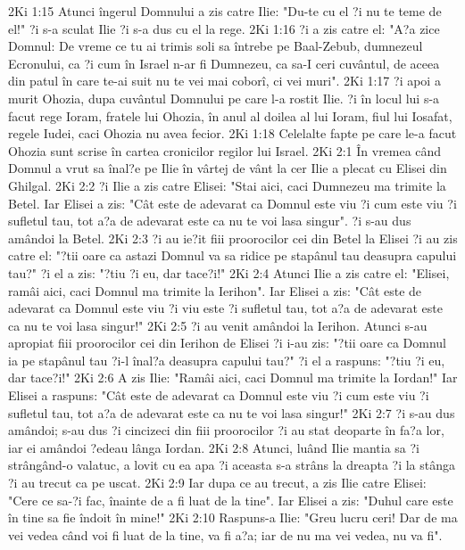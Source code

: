 2Ki 1:15  Atunci îngerul Domnului a zis catre Ilie: "Du-te cu el ?i nu te teme de el!" ?i s-a sculat Ilie ?i s-a dus cu el la rege.
2Ki 1:16  ?i a zis catre el: "A?a zice Domnul: De vreme ce tu ai trimis soli sa întrebe pe Baal-Zebub, dumnezeul Ecronului, ca ?i cum în Israel n-ar fi Dumnezeu, ca sa-I ceri cuvântul, de aceea din patul în care te-ai suit nu te vei mai coborî, ci vei muri".
2Ki 1:17  ?i apoi a murit Ohozia, dupa cuvântul Domnului pe care l-a rostit Ilie. ?i în locul lui s-a facut rege Ioram, fratele lui Ohozia, în anul al doilea al lui Ioram, fiul lui Iosafat, regele Iudei, caci Ohozia nu avea fecior.
2Ki 1:18  Celelalte fapte pe care le-a facut Ohozia sunt scrise în cartea cronicilor regilor lui Israel.
2Ki 2:1  În vremea când Domnul a vrut sa înal?e pe Ilie în vârtej de vânt la cer Ilie a plecat cu Elisei din Ghilgal.
2Ki 2:2  ?i Ilie a zis catre Elisei: "Stai aici, caci Dumnezeu ma trimite la Betel. Iar Elisei a zis: "Cât este de adevarat ca Domnul este viu ?i cum este viu ?i sufletul tau, tot a?a de adevarat este ca nu te voi lasa singur". ?i s-au dus amândoi la Betel.
2Ki 2:3  ?i au ie?it fiii proorocilor cei din Betel la Elisei ?i au zis catre el: "?tii oare ca astazi Domnul va sa ridice pe stapânul tau deasupra capului tau?" ?i el a zis: "?tiu ?i eu, dar tace?i!"
2Ki 2:4  Atunci Ilie a zis catre el: "Elisei, ramâi aici, caci Domnul ma trimite la Ierihon". Iar Elisei a zis: "Cât este de adevarat ca Domnul este viu ?i viu este ?i sufletul tau, tot a?a de adevarat este ca nu te voi lasa singur!"
2Ki 2:5  ?i au venit amândoi la Ierihon. Atunci s-au apropiat fiii proorocilor cei din Ierihon de Elisei ?i i-au zis: "?tii oare ca Domnul ia pe stapânul tau ?i-l înal?a deasupra capului tau?" ?i el a raspuns: "?tiu ?i eu, dar tace?i!"
2Ki 2:6  A zis Ilie: "Ramâi aici, caci Domnul ma trimite la Iordan!" Iar Elisei a raspuns: "Cât este de adevarat ca Domnul este viu ?i cum este viu ?i sufletul tau, tot a?a de adevarat este ca nu te voi lasa singur!"
2Ki 2:7  ?i s-au dus amândoi; s-au dus ?i cincizeci din fiii proorocilor ?i au stat deoparte în fa?a lor, iar ei amândoi ?edeau lânga Iordan.
2Ki 2:8  Atunci, luând Ilie mantia sa ?i strângând-o valatuc, a lovit cu ea apa ?i aceasta s-a strâns la dreapta ?i la stânga ?i au trecut ca pe uscat.
2Ki 2:9  Iar dupa ce au trecut, a zis Ilie catre Elisei: "Cere ce sa-?i fac, înainte de a fi luat de la tine". Iar Elisei a zis: "Duhul care este în tine sa fie îndoit în mine!"
2Ki 2:10  Raspuns-a Ilie: "Greu lucru ceri! Dar de ma vei vedea când voi fi luat de la tine, va fi a?a; iar de nu ma vei vedea, nu va fi".
